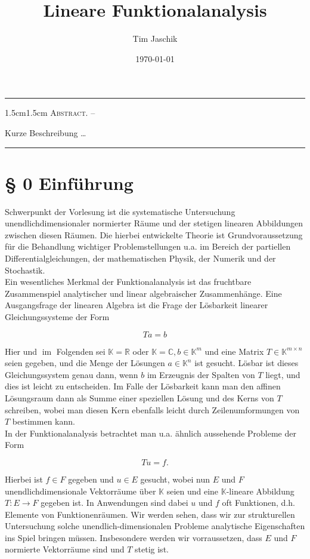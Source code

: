 \documentclass[10pt, letterpaper]{article}
\title{Lineare Funktionalanalysis}
\author{Tim Jaschik}
\date{\today}
\renewenvironment{abstract}
  {
    \begin{adjustwidth}{1.5cm}{1.5cm}
    \small
    \textsc{Abstract. –}%
  }
  {
    \end{adjustwidth}
  }
\begin{document}
\maketitle
\rule{\textwidth}{0.5pt}
\begin{abstract}
Kurze Beschreibung …
\end{abstract}
\rule{\textwidth}{0.5pt}
\vspace{0.5cm}

\tableofcontents

\pagebreak

\section*{§ 0 Einführung}
Schwerpunkt der Vorlesung ist die systematische Untersuchung unendlichdimensionaler normierter Räume und der stetigen linearen Abbildungen zwischen diesen Räumen. Die hierbei entwickelte Theorie ist Grundvoraussetzung für die Behandlung wichtiger Problemstellungen u.a. im Bereich der partiellen Differentialgleichungen, der mathematischen Physik, der Numerik und der Stochastik.\\
Ein wesentliches Merkmal der Funktionalanalysis ist das fruchtbare Zusammenspiel analytischer und linear algebraischer Zusammenhänge. Eine Ausgangsfrage der linearen Algebra ist die Frage der Lösbarkeit linearer Gleichungssysteme der Form

$$
T a=b
$$

Hier und $\operatorname{im}$ Folgenden sei $\mathbb{K}=\mathbb{R}$ oder $\mathbb{K}=\mathbb{C}, b \in \mathbb{K}^{m}$ und eine Matrix $T \in \mathbb{K}^{m \times n}$ seien gegeben, und die Menge der Lösungen $a \in \mathbb{K}^{n}$ ist gesucht. Lösbar ist dieses Gleichungssystem genau dann, wenn $b$ im Erzeugnis der Spalten von $T$ liegt, und dies ist leicht zu entscheiden. Im Falle der Lösbarkeit kann man den affinen Lösungsraum dann als Summe einer speziellen Lösung und des Kerns von $T$ schreiben, wobei man diesen Kern ebenfalls leicht durch Zeilenumformungen von $T$ bestimmen kann.\\
In der Funktionalanalysis betrachtet man u.a. ähnlich aussehende Probleme der Form

$$
T u=f .
$$

Hierbei ist $f \in F$ gegeben und $u \in E$ gesucht, wobei nun $E$ und $F$ unendlichdimensionale Vektorräume über $\mathbb{K}$ seien und eine $\mathbb{K}$-lineare Abbildung $T: E \rightarrow F$ gegeben ist. In Anwendungen sind dabei $u$ und $f$ oft Funktionen, d.h. Elemente von Funktionenräumen. Wir werden sehen, dass wir zur strukturellen Untersuchung solche unendlich-dimensionalen Probleme analytische Eigenschaften ins Spiel bringen müssen. Insbesondere werden wir vorraussetzen, dass $E$ und $F$ normierte Vektorräume sind und $T$ stetig ist.
\end{document}

